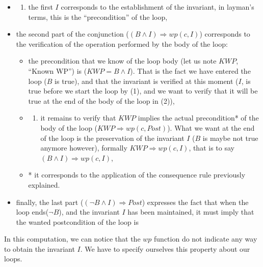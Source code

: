 \documentclass[12pt,francais,]{scrbook}
\providecommand{\tightlist}{%
  \setlength{\itemsep}{0pt}\setlength{\parskip}{0pt}}
\begin{document}
\begin{itemize}
\item
  \begin{enumerate}
  \def\labelenumi{(\arabic{enumi})}
  \tightlist
  \item
    the first \(I\) corresponds to the establishment of the invariant,
    in layman's terms, this is the ``precondition'' of the loop,
  \end{enumerate}
\item
  the second part of the conjunction
  (\((B \wedge I) \Rightarrow wp(c, I)\)) corresponds to the
  verification of the operation performed by the body of the loop:

  \begin{itemize}
  \item
    the precondition that we know of the loop body (let us note \(KWP\),
    ``Known WP'') is (\(KWP = B \wedge I\)). That is the fact we have
    entered the loop (\(B\) is true), and that the invariant is verified
    at this moment (\(I\), is true before we start the loop by (1), and
    we want to verify that it will be true at the end of the body of the
    loop in (2)),
  \item
    \begin{enumerate}
    \def\labelenumi{(\arabic{enumi})}
    \setcounter{enumi}{1}
    \tightlist
    \item
      it remains to verify that \(KWP\) implies the actual precondition*
      of the body of the loop (\(KWP \Rightarrow wp(c, Post)\)). What we
      want at the end of the loop is the preservation of the invariant
      \(I\) (\(B\) is maybe not true anymore however), formally
      \(KWP \Rightarrow wp(c, I)\), that is to say
      \((B \wedge I) \Rightarrow wp(c, I)\),
    \end{enumerate}
  \item
    * it corresponds to the application of the consequence rule
    previously explained.
  \end{itemize}
\item
  finally, the last part (\((\neg B \wedge I) \Rightarrow Post\))
  expresses the fact that when the loop ends(\(\neg B\)), and the
  invariant \(I\) has been maintained, it must imply that the wanted
  postcondition of the loop is
\end{itemize}

In this computation, we can notice that the \(wp\) function do not
indicate any way to obtain the invariant \(I\). We have to specify
ourselves this property about our loops.
\end{document}
